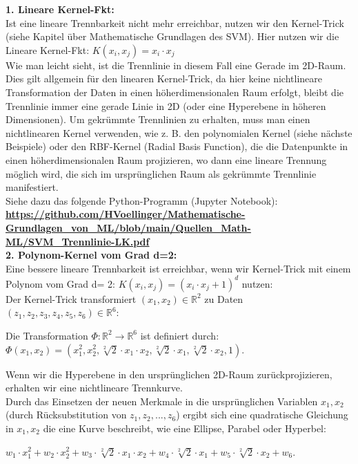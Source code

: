 \documentclass[12pt]{article}
\begin{document}
%
\textbf{1. Lineare Kernel-Fkt:}\\
Ist eine lineare Trennbarkeit nicht mehr erreichbar, nutzen wir den Kernel-Trick (siehe Kapitel über Mathematische Grundlagen des SVM). Hier nutzen wir die Lineare Kernel-Fkt:  \( K(x_i, x_j) = x_i \cdot x_j \)\\
Wie man leicht sieht, ist die Trennlinie in diesem Fall eine Gerade im 2D-Raum. Dies gilt  allgemein für den linearen Kernel-Trick, da hier keine nichtlineare Transformation der Daten in einen höherdimensionalen Raum erfolgt, bleibt die Trennlinie immer eine gerade Linie in 2D (oder eine Hyperebene in höheren Dimensionen).
Um gekrümmte Trennlinien zu erhalten, muss man einen nichtlinearen Kernel verwenden, wie z. B. den polynomialen Kernel (siehe nächste Beispiele) oder den RBF-Kernel (Radial Basis Function), die die Datenpunkte in einen höherdimensionalen Raum projizieren, wo dann eine lineare Trennung möglich wird, die sich im ursprünglichen Raum als gekrümmte Trennlinie manifestiert.\\[0.2cm]
Siehe dazu das folgende Python-Programm (Jupyter Notebook):\\[0.2cm]
\textbf{\url{https://github.com/HVoellinger/Mathematische-Grundlagen_von_ML/blob/main/Quellen_Math-ML/SVM_Trennlinie-LK.pdf}}\\[0.3cm]
%
\textbf{2. Polynom-Kernel vom Grad d=2:}\\
Eine bessere lineare Trennbarkeit ist erreichbar, wenn wir Kernel-Trick mit einem Polynom vom Grad d= 2: \( K(x_i, x_j) = (x_i \cdot x_j + 1)^d \) nutzen:\\[0.2cm]
%
Der Kernel-Trick transformiert $ (x_1, x_2) \in \mathbb{R}^2$ zu  Daten $ (z_1, z_2, z_3, z_4, z_5, z_6) \in \mathbb{R}^6$: 
\begin{center}
 Die Transformation $\Phi:\mathbb{R}^2 \rightarrow\mathbb{R}^6$ ist definiert durch: \\[0.2cm]
 $\Phi(x_1,x_2) = (x_1^2, x_2^2, \sqrt[2]{2} \cdot x_1 \cdot x_2, \sqrt[2]{2} \cdot x_1, \sqrt[2]{2} \cdot x_2, 1)$. 
\end{center} 
%
Wenn wir die Hyperebene in den ursprünglichen 2D-Raum zurückprojizieren, erhalten wir eine nichtlineare Trennkurve.\\
Durch das Einsetzen der neuen Merkmale in die ursprünglichen Variablen $ x_1, x_2 $ (durch Rücksubstitution von $ z_1, z_2,...,z_6$) ergibt sich eine quadratische Gleichung in $x_1,x_2$
die eine Kurve beschreibt, wie eine Ellipse, Parabel oder Hyperbel:
%
\begin{center}
$ w_1 \cdot x_1^2 + w_2 \cdot x_2^2 + w_3 \cdot \sqrt[2]{2} \cdot x_1 \cdot x_2 + w_4 \cdot \sqrt[2]{2} \cdot x_1 + w_5 \cdot \sqrt[2]{2} \cdot x_2 + w_6 $. 
\end{center}
\end{document}
